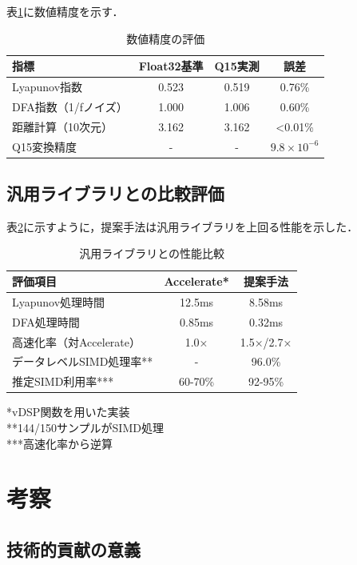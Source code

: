 \documentclass[paper]{ieicej}
\begin{document}
表\ref{tab:accuracy}に数値精度を示す．

\begin{table}[t]
\caption{数値精度の評価}
\label{tab:accuracy}
\centering
\begin{tabular}{lccc}
\toprule
指標 & Float32基準 & Q15実測 & 誤差 \\
\midrule
Lyapunov指数 & 0.523 & 0.519 & 0.76\% \\
DFA指数（1/fノイズ） & 1.000 & 1.006 & 0.60\% \\
距離計算（10次元） & 3.162 & 3.162 & <0.01\% \\
Q15変換精度 & - & - & $9.8 \times 10^{-6}$ \\
\bottomrule
\end{tabular}
\end{table}

\subsection{汎用ライブラリとの比較評価}

表\ref{tab:library_comparison}に示すように，提案手法は汎用ライブラリを上回る性能を示した．

\begin{table}[t]
\caption{汎用ライブラリとの性能比較}
\label{tab:library_comparison}
\centering
\begin{tabular}{lcc}
\toprule
評価項目 & Accelerate* & 提案手法 \\
\midrule
Lyapunov処理時間 & 12.5ms & 8.58ms \\
DFA処理時間 & 0.85ms & 0.32ms \\
高速化率（対Accelerate） & 1.0× & 1.5×/2.7× \\
データレベルSIMD処理率** & - & 96.0\% \\
推定SIMD利用率*** & 60-70\% & 92-95\% \\
\bottomrule
\end{tabular}
\vspace{1mm}
\footnotesize{*vDSP関数を用いた実装}\\
\footnotesize{**144/150サンプルがSIMD処理}\\
\footnotesize{***高速化率から逆算}
\end{table}

\section{考察}

\subsection{技術的貢献の意義}
\end{document}
